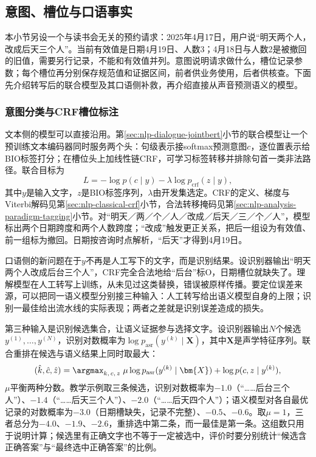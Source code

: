 \subsection{意图、槽位与口语事实}
\label{sec:nlp-speech-semantics}

本小节另设一个与读书会无关的预约请求：2025年4月17日，用户说“明天两个人，改成后天三个人”。当前有效值是日期4月19日、人数3；4月18日与人数2是被撤回的旧值，需要另行记录，不能和有效值并列。意图说明请求做什么，槽位记录参数；每个槽位再分别保存规范值和证据区间，前者供业务使用，后者供核查。下面先介绍转写后的联合模型及其口语侧补救，再介绍直接从声音预测语义的模型。

\subsubsection{意图分类与CRF槽位标注}
\label{sec:nlp-speech-intent-crf}

文本侧的模型可以直接沿用。第\ref{sec:nlp-dialogue-jointbert}小节的联合模型让一个预训练文本编码器同时服务两个头：句级表示接softmax预测意图$c$，逐位置表示给BIO标签打分；在槽位头上加线性链CRF，可学习标签转移并排除句首一类非法路径。联合目标为
\[
  L=-\log p(c\mid y)-\lambda\log p_{\mathrm{crf}}(z\mid y),
\]
其中$y$是输入文字，$z$是BIO标签序列，$\lambda$由开发集选定。CRF的定义、梯度与Viterbi解码见第\ref{sec:nlp-classical-crf}小节，合法转移掩码见第\ref{sec:nlp-analysis-paradigm-tagging}小节。对“明天／两／个／人／改成／后天／三／个／人”，模型标出两个日期跨度和两个人数跨度；“改成”触发更正关系，把后一组设为有效值、前一组标为撤回。日期按咨询时点解析，“后天”才得到4月19日。

口语侧的新问题在于$y$不再是人工写下的文字，而是识别结果。设识别器输出“明天两个人改成后台三个人”，CRF完全合法地给“后台”标O，日期槽位就缺失了。理解模型在人工转写上训练，从未见过这类替换，错误被原样传播。要定位误差来源，可以把同一语义模型分别接三种输入：人工转写给出语义模型自身的上限；识别一最佳给出流水线的实际表现；两者之差就是识别误差造成的损失。

第三种输入是识别候选集合，让语义证据参与选择文字。设识别器输出$N$个候选$y^{(1)},\ldots,y^{(N)}$，识别对数概率为$\log p_{\mathrm{asr}}(y^{(k)}\mid\bm{X})$，其中$\bm{X}$是声学特征序列。联合重排在候选与语义结果上同时取最大：
\begin{equation}
  (\hat k,\hat c,\hat z)=\argmax_{k,\,c,\,z}\;
  \mu\log p_{\mathrm{asr}}(y^{(k)}\mid\bm{X})
  +\log p(c,z\mid y^{(k)}),
  \label{eq:nlp-speech-slu-rerank}
\end{equation}
$\mu$平衡两种分数。教学示例取三条候选，识别对数概率为$-1.0$（“……后台三个人”）、$-1.4$（“……后天三个人”）、$-2.0$（“……后天四个人”）；语义模型对各自最优记录的对数概率为$-3.0$（日期槽缺失，记录不完整）、$-0.5$、$-0.6$。取$\mu=1$，三者总分为$-4.0$、$-1.9$、$-2.6$，重排选中第二条，而一最佳是第一条。这组数只用于说明计算；候选里有正确文字也不等于一定被选中，评价时要分别统计“候选含正确答案”与“最终选中正确答案”的比例。

